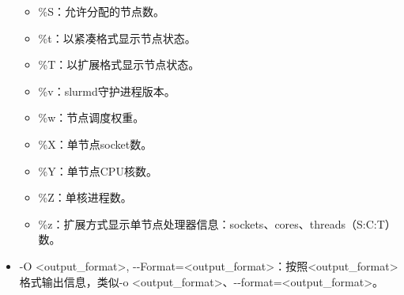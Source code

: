\begin{itemize}
\begin{itemize}
   	\item \%S：允许分配的节点数。
   	\item \%t：以紧凑格式显示节点状态。
   	\item \%T：以扩展格式显示节点状态。
   	\item \%v：slurmd守护进程版本。
   	\item \%w：节点调度权重。
   	\item \%X：单节点socket数。
   	\item \%Y：单节点CPU核数。
   	\item \%Z：单核进程数。
   	\item \%z：扩展方式显示单节点处理器信息：sockets、cores、threads（S:C:T）数。
\end{itemize}
	\item -O <output\_format>, -{}-Format=<output\_format>：按照<output\_format>格式输出信息，类似-o <output\_format>、-{}-format=<output\_format>。


\end{itemize}
